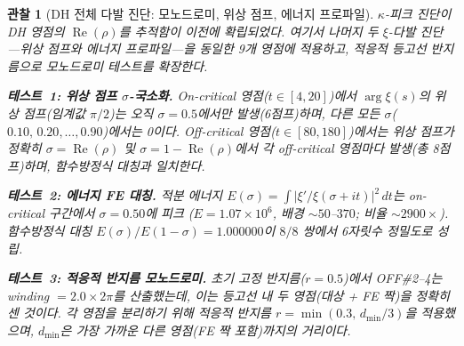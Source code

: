 \documentclass[11pt, a4paper]{article}
\theoremstyle{definition}
\theoremstyle{plain}
\newtheorem{observation}[theorem]{관찰}
\begin{document}
\begin{observation}[DH 전체 다발 진단: 모노드로미, 위상 점프, 에너지 프로파일]
\label{obs:dh_bundle_diagnostic}
$\kappa$-피크 진단이 DH 영점의 $\operatorname{Re}(\rho)$를 추적함이
이전에 확립되었다.
여기서 나머지 두 $\xi$-다발 진단---\emph{위상 점프}와 \emph{에너지 프로파일}---을
동일한 9개 영점에 적용하고, 적응적 등고선 반지름으로 모노드로미 테스트를 확장한다.

\smallskip\noindent
\textbf{테스트~1: 위상 점프 $\sigma$-국소화.}\;
On-critical 영점($t\in[4,20]$)에서 $\arg\xi(s)$의 위상 점프(임계값 $\pi/2$)는
\emph{오직} $\sigma=0.5$에서만 발생(6점프)하며,
다른 모든 $\sigma$($0.10,\,0.20,\ldots,0.90$)에서는 0이다.
Off-critical 영점($t\in[80,180]$)에서는 위상 점프가 정확히
$\sigma = \operatorname{Re}(\rho)$ \emph{및} $\sigma = 1 - \operatorname{Re}(\rho)$에서
각 off-critical 영점마다 발생(총 8점프)하며, 함수방정식 대칭과 일치한다.

\smallskip\noindent
\textbf{테스트~2: 에너지 FE 대칭.}\;
적분 에너지 $E(\sigma) = \int |\xi'/\xi(\sigma+it)|^2\,dt$는
on-critical 구간에서 $\sigma=0.50$에 피크
($E = 1.07{\times}10^6$, 배경 $\sim50$--$370$; 비율 ${\sim}2900\times$).
함수방정식 대칭 $E(\sigma)/E(1{-}\sigma) = 1.000000$이
$8/8$ 쌍에서 6자릿수 정밀도로 성립.

\smallskip\noindent
\textbf{테스트~3: 적응적 반지름 모노드로미.}\;
초기 고정 반지름($r=0.5$)에서 OFF\#2--4는 winding $=2.0\times 2\pi$를
산출했는데, 이는 등고선 내 두 영점(대상 + FE 짝)을 정확히 센 것이다.
각 영점을 분리하기 위해 적응적 반지름
$r = \min(0.3,\, d_{\min}/3)$을 적용했으며,
$d_{\min}$은 가장 가까운 다른 영점(FE 짝 포함)까지의 거리이다.


\end{observation}
\end{document}
